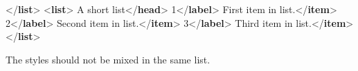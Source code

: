 \documentclass[11pt,twoside]{article}\makeatletter
\begin{document}
\begin{shaded}
{</\textbf{list}>}\mbox{}\newline 
{<\textbf{list}>}\mbox{}\newline 
{}A short list{</\textbf{head}>}\mbox{}\newline 
{}1{</\textbf{label}>}\mbox{}\newline 
{}First item in list.{</\textbf{item}>}\mbox{}\newline 
{}2{</\textbf{label}>}\mbox{}\newline 
{}Second item in list.{</\textbf{item}>}\mbox{}\newline 
{}3{</\textbf{label}>}\mbox{}\newline 
{}Third item in list.{</\textbf{item}>}\mbox{}\newline 
{</\textbf{list}>}\end{shaded}\egroup\par \noindent  The styles should not be mixed in the same list.\par
\end{document}
